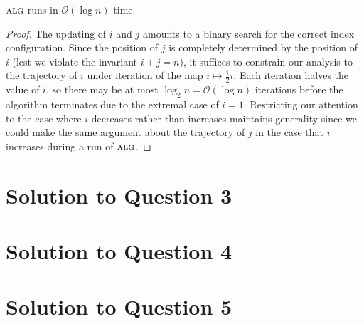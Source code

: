 \documentclass[11pt]{article}
\renewcommand{\O}{\mathcal{O}}
\newcommand{\alg}{\textsc{alg}}
\begin{document}
 $\alg$ runs in $\O(\log n)$ time.

\begin{proof}
  The updating of $i$ and $j$ amounts to a binary search for the correct index configuration.
  Since the position of $j$ is completely determined by the position of $i$ (lest we violate the invariant $i + j = n$), it suffices to constrain our analysis to the trajectory of $i$ under iteration of the map $i \mapsto \frac{1}{2}i$.
  Each iteration halves the value of $i$, so there may be at most $\log_{2}n = \O(\log n)$ iterations before the algorithm terminates due to the extremal case of $i = 1$.
  Restricting our attention to the case where $i$ decreases rather than increases maintains generality since we could make the same argument about the trajectory of $j$ in the case that $i$ increases during a run of $\alg$.
\end{proof}
\section{Solution to Question 3}



\section{Solution to Question 4}



\section{Solution to Question 5}
\end{document}
